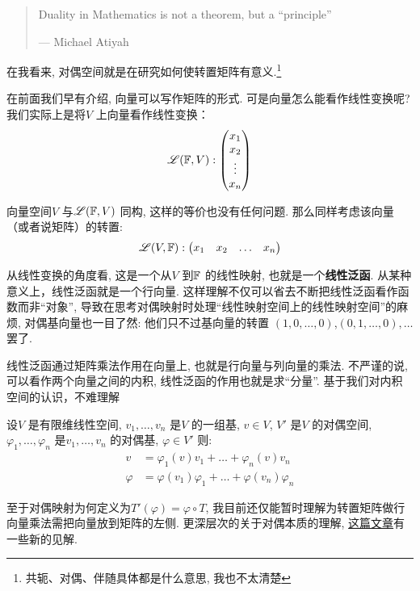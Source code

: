 \begin{quote}
    Duality in Mathematics is not a theorem, but a ``principle''

    \hfill --- Michael Atiyah
\end{quote}

在我看来, 对偶空间就是在研究如何使转置矩阵有意义.\footnote{共轭、对偶、伴随具体都是什么意思,
我也不太清楚}

在前面我们早有介绍, 向量可以写作矩阵的形式. 可是向量怎么能看作线性变换呢? 我们实际上是将\(V\)
上向量看作线性变换：\[
    \mathscr{L}(\mathbb{F},V):
    \begin{pmatrix}
        x_1 \\
        x_2 \\
        \vdots \\
        x_n
    \end{pmatrix}
\]

向量空间\(V\) 与\(\mathscr{L}(\mathbb{F},V)\) 同构, 这样的等价也没有任何问题.
那么同样考虑该向量（或者说矩阵）的转置:
\[
    \mathscr{L}(V,\mathbb{F}):
    \begin{pmatrix}
        x_1 & x_2 & \dots & x_n
    \end{pmatrix}
\]

从线性变换的角度看, 这是一个从\(V\) 到\(\mathbb{F}\) 的线性映射, 也就是一个\textbf{线性泛函}.
从某种意义上，线性泛函就是一个行向量. 这样理解不仅可以省去不断把线性泛函看作函数而非``对象'',
导致在思考对偶映射时处理``线性映射空间上的线性映射空间''的麻烦, 对偶基向量也一目了然:
他们只不过基向量的转置 \((1,0,\dots ,0)\),\((0,1,\dots ,0),\dots \) 罢了.

线性泛函通过矩阵乘法作用在向量上, 也就是行向量与列向量的乘法. 不严谨的说, 可以看作两个向量之间的内积,
线性泛函的作用也就是求``分量''. 基于我们对内积空间的认识，不难理解
\begin{theorem}
    设\(V\) 是有限维线性空间, \(v_{1}, \dots ,v_{n}\) 是\(V\) 的一组基, \(v \in V\),
    \(V'\) 是\(V\) 的对偶空间, \(\varphi_{1}, \dots ,\varphi_{n}\)
    是\(v_{1}, \dots ,v_{n}\) 的对偶基, \(\varphi \in V'\)
    则:
    \begin{align*}
        v &= \varphi_{1}(v)v_{1} + \dots + \varphi_{n}(v)v_{n} \\
        \varphi &= \varphi(v_{1})\varphi_{1} + \dots +
        \varphi(v_{n})\varphi_{n}
    \end{align*}
\end{theorem}

至于对偶映射为何定义为\(T'(\varphi)=\varphi \circ T\),
我目前还仅能暂时理解为转置矩阵做行向量乘法需把向量放到矩阵的左侧. 更深层次的关于对偶本质的理解,
\href{https://www.zhihu.com/question/38464481/answer/2110009942}{这篇文章}有一些新的见解.

